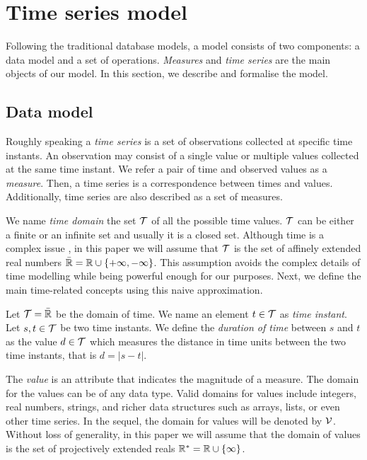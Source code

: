 
\section{Time series model}
\label{sec:model:TSMS}

Following the traditional database models, a  model
consists of two components: a data model and a set of
operations. \emph{Measures} and \emph{time series} are the main
objects of our  model.
%
In this section, we describe and formalise the  model. 


\subsection{Data model}

Roughly speaking a \emph{time series} is a set of observations
collected at specific time instants. An observation may consist of a
single value or multiple values collected at the same time instant. We
refer a pair of time and observed values as a \emph{measure}. Then, a
time series is a correspondence between times and
values. Additionally, time series are also described as a set of
measures.

We name \emph{time domain} the set $\cal{T}$ of all the possible time
values. $\cal{T}$ can be either a finite or an infinite set and
usually it is a closed set. Although time is a complex issue
\cite{iep:time-supplement}, in this paper we will assume that
$\cal{T}$ is the set of affinely extended real numbers $\bar{\mathbb{R}} = \mathbb{R} \cup
\{+\infty,-\infty\}$. This assumption avoids the complex details of
time modelling while being powerful enough for our purposes. Next, we
define the main time-related concepts using this naive approximation.

\begin{definition}
  \label{def:model:temps}
  Let $\cal{T}=\bar{\mathbb{R}}$ be the domain of time. We name an element
  $t\in\cal{T}$ as \emph{time instant}. Let $s,t\in\cal{T}$ be two
  time instants.  We define the \emph{duration of time} between $s$
  and $t$ as the value $d\in\cal{T}$ which measures the distance in
  time units between the two time instants, that is $d =|s-t|$.
\end{definition}

The \emph{value} is an attribute that indicates the magnitude of a
measure. The domain for the values can be of any data type. Valid
domains for values include integers, real numbers, strings, and richer
data structures such as arrays, lists, or even other time series. In
the sequel, the domain for values will be denoted by
$\cal{V}$. Without loss of generality, in this paper we will assume
that the domain of values is the set of projectively extended reals
$\mathbb{R}^{*} = \mathbb{R} \cup \{\infty\}$.

